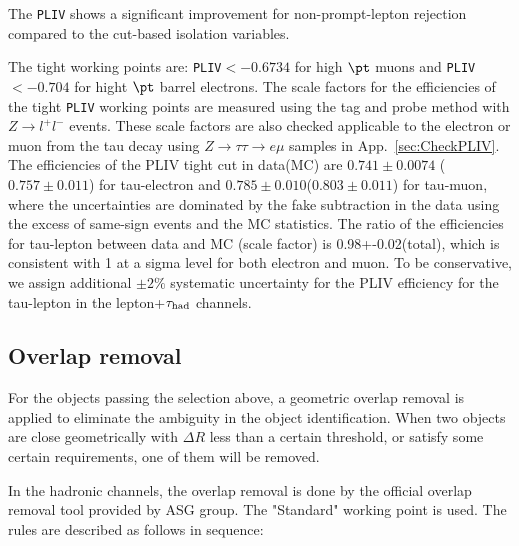 The \texttt{PLIV} shows a significant improvement for non-prompt-lepton rejection compared to the cut-based isolation variables.

The tight working points are: \texttt{PLIV}$<-0.6734$ for high $\pt$ muons and \texttt{PLIV}$<-0.704$ for hight $\pt$ barrel electrons. The scale factors for the efficiencies of the tight \texttt{PLIV} working points are measured using the tag and probe method with $Z\rightarrow l^+l^-$ events. These scale
factors are also checked applicable to the electron or muon from the tau decay using $Z\rightarrow\tau\tau\rightarrow e\mu$ samples in App.~\ref{sec:CheckPLIV}.
The efficiencies of the PLIV tight cut in data(MC) are $0.741\pm 0.0074$ ($0.757\pm 0.011$) for tau-electron and $0.785\pm 0.010$($0.803\pm 0.011$) for tau-muon, where the uncertainties are dominated by the fake subtraction in the data using the excess of same-sign events and the MC statistics.
The ratio of the efficiencies for tau-lepton between data and MC (scale factor) is 0.98+-0.02(total), which is consistent with 1 at a sigma level for
both electron and muon. To be conservative, we assign additional $\pm 2\%$ systematic uncertainty for the PLIV efficiency for the tau-lepton in
the lepton+$\tau_\text{had}$ channels.

\subsection{Overlap removal}
For the objects passing the selection above, a geometric overlap removal is applied to eliminate the ambiguity in the object identification.  When two objects are close geometrically with $\Delta R$ less than a certain threshold, or satisfy some certain requirements, one of them will be removed. 

In the hadronic channels, the overlap removal is done by the official overlap removal tool provided by ASG group. The "Standard" working point is used. The rules are described as follows in sequence:

